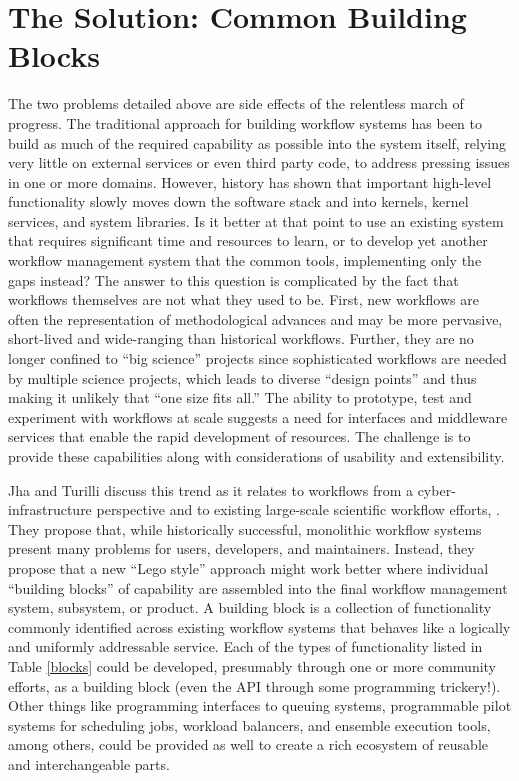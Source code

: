 \section{The Solution: Common Building Blocks}\label{buildings-blocks}

The two problems detailed above are side effects of the relentless march of
progress. The traditional approach for building workflow systems has been to
build as much of the required capability as possible into the system itself,
relying very little on external services or even third party code, to address
pressing issues in one or more domains. However, history has shown that
important high-level functionality slowly moves down the software stack and into
kernels, kernel services, and system libraries. Is it better at that point to
use an existing system that requires significant time and resources to learn, or
to develop yet another workflow management system that the common tools,
implementing only the gaps instead? The answer to this question is complicated
by the fact that workflows themselves are not what they used to be. First, new
workflows are often the representation of methodological advances and may be
more pervasive, short-lived and wide-ranging than historical workflows. Further,
they are no longer confined to ``big science'' projects since sophisticated
workflows are needed by multiple science projects, which leads to diverse
“design points” and thus making it unlikely that ``one size fits all.''  The
ability to prototype, test and experiment with workflows at scale suggests a
need for interfaces and middleware services that enable the rapid development of
resources. The challenge is to provide these capabilities along with
considerations of usability and extensibility.
 
Jha and Turilli discuss this trend as it relates to workflows from a
cyber-infrastructure perspective and to existing large-scale scientific workflow
efforts, \cite{jha_building_2016}. They propose that, while historically
successful, monolithic workflow systems present many problems for users,
developers, and maintainers. Instead, they propose that a new ``Lego style''
approach might work better where individual ``building blocks'' of capability
are assembled into the final workflow management system, subsystem, or product.
A building block is a collection of functionality commonly identified across
existing workflow systems that behaves like a logically and uniformly
addressable service. Each of the types of functionality listed in Table
\ref{blocks} could be developed, presumably through one or more community
efforts, as a building block (even the API through some programming trickery!).
Other things like programming interfaces to queuing systems, programmable pilot
systems for scheduling jobs, workload balancers, and ensemble execution tools,
among others, could be provided as well to create a rich ecosystem of reusable
and interchangeable parts.

